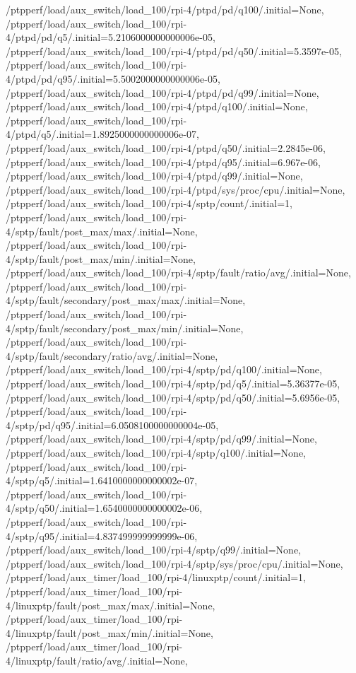 {    /ptpperf/load/aux_switch/load_100/rpi-4/ptpd/pd/q100/.initial=None,
    /ptpperf/load/aux_switch/load_100/rpi-4/ptpd/pd/q5/.initial=5.2106000000000006e-05,
    /ptpperf/load/aux_switch/load_100/rpi-4/ptpd/pd/q50/.initial=5.3597e-05,
    /ptpperf/load/aux_switch/load_100/rpi-4/ptpd/pd/q95/.initial=5.5002000000000006e-05,
    /ptpperf/load/aux_switch/load_100/rpi-4/ptpd/pd/q99/.initial=None,
    /ptpperf/load/aux_switch/load_100/rpi-4/ptpd/q100/.initial=None,
    /ptpperf/load/aux_switch/load_100/rpi-4/ptpd/q5/.initial=1.8925000000000006e-07,
    /ptpperf/load/aux_switch/load_100/rpi-4/ptpd/q50/.initial=2.2845e-06,
    /ptpperf/load/aux_switch/load_100/rpi-4/ptpd/q95/.initial=6.967e-06,
    /ptpperf/load/aux_switch/load_100/rpi-4/ptpd/q99/.initial=None,
    /ptpperf/load/aux_switch/load_100/rpi-4/ptpd/sys/proc/cpu/.initial=None,
    /ptpperf/load/aux_switch/load_100/rpi-4/sptp/count/.initial=1,
    /ptpperf/load/aux_switch/load_100/rpi-4/sptp/fault/post_max/max/.initial=None,
    /ptpperf/load/aux_switch/load_100/rpi-4/sptp/fault/post_max/min/.initial=None,
    /ptpperf/load/aux_switch/load_100/rpi-4/sptp/fault/ratio/avg/.initial=None,
    /ptpperf/load/aux_switch/load_100/rpi-4/sptp/fault/secondary/post_max/max/.initial=None,
    /ptpperf/load/aux_switch/load_100/rpi-4/sptp/fault/secondary/post_max/min/.initial=None,
    /ptpperf/load/aux_switch/load_100/rpi-4/sptp/fault/secondary/ratio/avg/.initial=None,
    /ptpperf/load/aux_switch/load_100/rpi-4/sptp/pd/q100/.initial=None,
    /ptpperf/load/aux_switch/load_100/rpi-4/sptp/pd/q5/.initial=5.36377e-05,
    /ptpperf/load/aux_switch/load_100/rpi-4/sptp/pd/q50/.initial=5.6956e-05,
    /ptpperf/load/aux_switch/load_100/rpi-4/sptp/pd/q95/.initial=6.0508100000000004e-05,
    /ptpperf/load/aux_switch/load_100/rpi-4/sptp/pd/q99/.initial=None,
    /ptpperf/load/aux_switch/load_100/rpi-4/sptp/q100/.initial=None,
    /ptpperf/load/aux_switch/load_100/rpi-4/sptp/q5/.initial=1.6410000000000002e-07,
    /ptpperf/load/aux_switch/load_100/rpi-4/sptp/q50/.initial=1.6540000000000002e-06,
    /ptpperf/load/aux_switch/load_100/rpi-4/sptp/q95/.initial=4.837499999999999e-06,
    /ptpperf/load/aux_switch/load_100/rpi-4/sptp/q99/.initial=None,
    /ptpperf/load/aux_switch/load_100/rpi-4/sptp/sys/proc/cpu/.initial=None,
    /ptpperf/load/aux_timer/load_100/rpi-4/linuxptp/count/.initial=1,
    /ptpperf/load/aux_timer/load_100/rpi-4/linuxptp/fault/post_max/max/.initial=None,
    /ptpperf/load/aux_timer/load_100/rpi-4/linuxptp/fault/post_max/min/.initial=None,
    /ptpperf/load/aux_timer/load_100/rpi-4/linuxptp/fault/ratio/avg/.initial=None,
}
